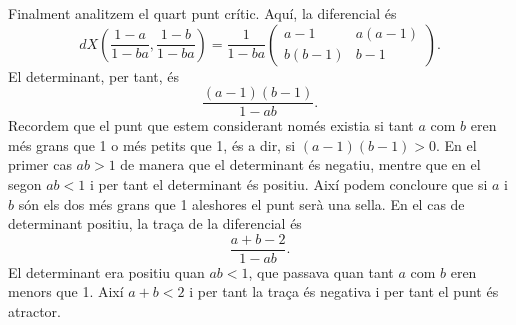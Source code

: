 \documentclass[12pt]{article}
\numberwithin{table}{section}
\numberwithin{equation}{section}
\numberwithin{figure}{section}
\begin{document}
Finalment analitzem el quart punt crític. Aquí, la diferencial és
\begin{equation*}
	dX\left(\frac{1 - a}{1 - ba}, \frac{1 - b}{1 - ba}\right) = \frac{1}{1 - ba} \begin{pmatrix}
		a - 1 & a(a-1) \\
		b(b-1) & b -1
	\end{pmatrix}.
\end{equation*}
El determinant, per tant, és
\begin{equation*}
	\frac{(a - 1)(b-1)}{1 - ab}.
\end{equation*}
Recordem que el punt que estem considerant només existia si tant \( a \) com \( b \) eren més grans que 1 o més petits que 1, és a dir, si \( (a-1)(b-1) > 0 \). En el primer cas \( ab > 1 \) de manera que el determinant és negatiu, mentre que en el segon \( ab < 1 \) i per tant el determinant és positiu. Així podem concloure que si \( a \) i \( b \) són els dos més grans que 1 aleshores el punt serà una sella. En el cas de determinant positiu, la traça de la diferencial és
\begin{equation*}
	\frac{a + b -2}{1 - ab}.
\end{equation*}
El determinant era positiu quan \( ab < 1 \), que passava quan tant \( a \) com \( b \) eren menors que 1. Així \( a+b < 2 \) i per tant la traça és negativa i per tant el punt és atractor. 
\end{document}
